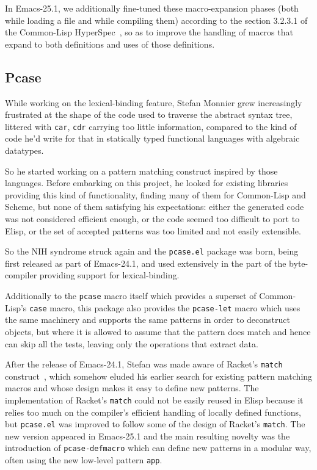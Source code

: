 \documentclass[format=acmsmall, review=false, screen=true]{acmart}
\newcommand \Elisp {Elisp}
\begin{document}
In Emacs-25.1, we additionally fine-tuned these macro-expansion phases (both
while loading a file and while compiling them) according to the section
3.2.3.1 of the Common-Lisp HyperSpec~\cite{HyperSpec}, so as to improve the
handling of macros that expand to both definitions and uses of
those definitions.

\subsection{Pcase}           %

While working on the lexical-binding feature, Stefan Monnier grew
increasingly frustrated at the shape of the code used to traverse the
abstract syntax tree, littered with \texttt{car}, \texttt{cdr} carrying too
little information, compared to the kind of code he'd write for that in
statically typed functional languages with algebraic datatypes.

So he started working on a pattern matching construct inspired by those
languages.  Before embarking on this project, he looked for existing
libraries providing this kind of functionality, finding many of them for
Common-Lisp and Scheme, but none of them satisfying his expectations: either
the generated code was not considered efficient enough, or the code seemed
too difficult to port to \Elisp{}, or the set of accepted patterns was too
limited and not easily extensible.

So the NIH syndrome struck again and the \texttt{pcase.el} package was born,
being first released as part of Emacs-24.1, and used extensively in the part
of the byte-compiler providing support for lexical-binding.

Additionally to the \texttt{pcase} macro itself which provides a superset of
Common-Lisp's \texttt{case} macro, this package also provides the
\texttt{pcase-let} macro which uses the same machinery and supports the same
patterns in order to deconstruct objects, but where it is allowed to assume
that the pattern does match and hence can skip all the tests, leaving only the
operations that extract data.

After the release of Emacs-24.1, Stefan was made aware of Racket's
\texttt{match} construct~\cite{RacketReference2018}, which somehow eluded
his earlier search for
existing pattern matching macros and whose design makes it easy to define
new patterns.  The implementation of Racket's \texttt{match} could not be
easily reused in \Elisp{} because it relies too much on the compiler's
efficient handling of locally defined functions, but \texttt{pcase.el} was
improved to follow some of the design of Racket's \texttt{match}.
The new version appeared in Emacs-25.1 and the main resulting novelty was the
introduction of \texttt{pcase-defmacro} which can define new patterns
in a modular way, often using the new low-level pattern \texttt{app}.
\end{document}
